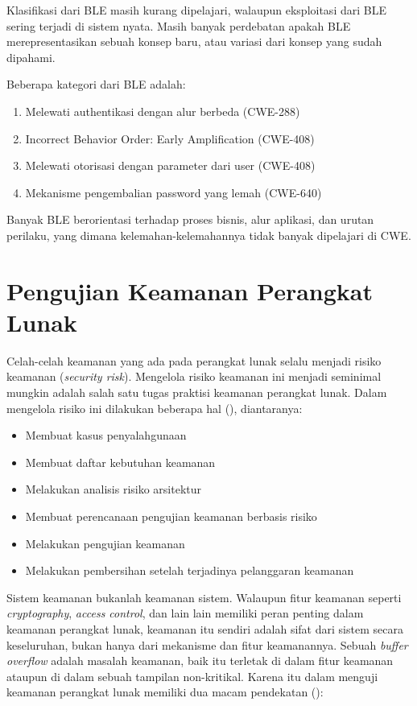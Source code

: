 Klasifikasi dari BLE masih kurang dipelajari, walaupun eksploitasi dari BLE
sering terjadi di sistem nyata. Masih banyak perdebatan apakah BLE merepresentasikan
sebuah konsep baru, atau variasi dari konsep yang sudah dipahami.

Beberapa kategori dari BLE adalah:

\begin{enumerate}
  \item Melewati authentikasi dengan alur berbeda (CWE-288)
  \item Incorrect Behavior Order: Early Amplification (CWE-408)
  \item Melewati otorisasi dengan parameter dari user (CWE-408)
  \item Mekanisme pengembalian password yang lemah (CWE-640)
\end{enumerate}

Banyak BLE berorientasi terhadap proses bisnis, alur aplikasi, dan urutan perilaku,
yang dimana kelemahan-kelemahannya tidak banyak dipelajari di CWE.


\section{Pengujian Keamanan Perangkat Lunak}

Celah-celah keamanan yang ada pada perangkat lunak selalu menjadi risiko keamanan (\emph{security risk}).
Mengelola risiko keamanan ini menjadi seminimal mungkin adalah salah satu tugas praktisi keamanan perangkat lunak.
Dalam mengelola risiko ini dilakukan beberapa hal (\cite{grawsectest}), diantaranya:

\begin{itemize}
  \item Membuat kasus penyalahgunaan
  \item Membuat daftar kebutuhan keamanan
  \item Melakukan analisis risiko arsitektur
  \item Membuat perencanaan pengujian keamanan berbasis risiko
  \item Melakukan pengujian keamanan
  \item Melakukan pembersihan setelah terjadinya pelanggaran keamanan
\end{itemize}

Sistem keamanan bukanlah keamanan sistem. Walaupun fitur keamanan seperti \emph{cryptography},
\emph{access control}, dan lain lain memiliki peran penting dalam keamanan perangkat lunak,
keamanan itu sendiri adalah sifat dari sistem secara keseluruhan, bukan hanya dari mekanisme
dan fitur keamanannya. Sebuah \emph{buffer overflow} adalah masalah keamanan, baik itu terletak di dalam
fitur keamanan ataupun di dalam sebuah tampilan non-kritikal.
Karena itu dalam menguji keamanan perangkat lunak memiliki dua macam pendekatan (\cite{grawsec}):

